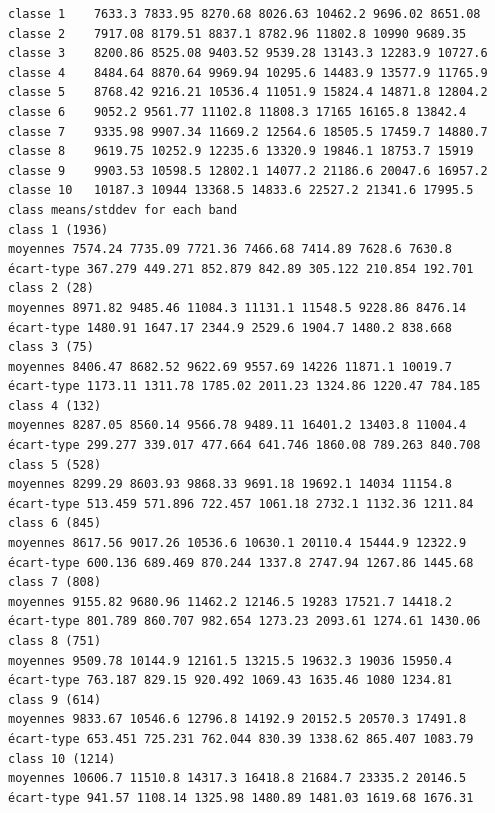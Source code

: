 \documentclass[environments,article,submit,pdftex,moreauthors]{Definitions/mdpi}
\begin{document}
\begin{scriptsize}
\begin{verbatim}
classe 1    7633.3 7833.95 8270.68 8026.63 10462.2 9696.02 8651.08
classe 2    7917.08 8179.51 8837.1 8782.96 11802.8 10990 9689.35
classe 3    8200.86 8525.08 9403.52 9539.28 13143.3 12283.9 10727.6
classe 4    8484.64 8870.64 9969.94 10295.6 14483.9 13577.9 11765.9
classe 5    8768.42 9216.21 10536.4 11051.9 15824.4 14871.8 12804.2
classe 6    9052.2 9561.77 11102.8 11808.3 17165 16165.8 13842.4
classe 7    9335.98 9907.34 11669.2 12564.6 18505.5 17459.7 14880.7
classe 8    9619.75 10252.9 12235.6 13320.9 19846.1 18753.7 15919
classe 9    9903.53 10598.5 12802.1 14077.2 21186.6 20047.6 16957.2
classe 10   10187.3 10944 13368.5 14833.6 22527.2 21341.6 17995.5
class means/stddev for each band
class 1 (1936)
moyennes 7574.24 7735.09 7721.36 7466.68 7414.89 7628.6 7630.8
écart-type 367.279 449.271 852.879 842.89 305.122 210.854 192.701
class 2 (28)
moyennes 8971.82 9485.46 11084.3 11131.1 11548.5 9228.86 8476.14
écart-type 1480.91 1647.17 2344.9 2529.6 1904.7 1480.2 838.668
class 3 (75)
moyennes 8406.47 8682.52 9622.69 9557.69 14226 11871.1 10019.7
écart-type 1173.11 1311.78 1785.02 2011.23 1324.86 1220.47 784.185
class 4 (132)
moyennes 8287.05 8560.14 9566.78 9489.11 16401.2 13403.8 11004.4
écart-type 299.277 339.017 477.664 641.746 1860.08 789.263 840.708
class 5 (528)
moyennes 8299.29 8603.93 9868.33 9691.18 19692.1 14034 11154.8
écart-type 513.459 571.896 722.457 1061.18 2732.1 1132.36 1211.84
class 6 (845)
moyennes 8617.56 9017.26 10536.6 10630.1 20110.4 15444.9 12322.9
écart-type 600.136 689.469 870.244 1337.8 2747.94 1267.86 1445.68
class 7 (808)
moyennes 9155.82 9680.96 11462.2 12146.5 19283 17521.7 14418.2
écart-type 801.789 860.707 982.654 1273.23 2093.61 1274.61 1430.06
class 8 (751)
moyennes 9509.78 10144.9 12161.5 13215.5 19632.3 19036 15950.4
écart-type 763.187 829.15 920.492 1069.43 1635.46 1080 1234.81
class 9 (614)
moyennes 9833.67 10546.6 12796.8 14192.9 20152.5 20570.3 17491.8
écart-type 653.451 725.231 762.044 830.39 1338.62 865.407 1083.79
class 10 (1214)
moyennes 10606.7 11510.8 14317.3 16418.8 21684.7 23335.2 20146.5
écart-type 941.57 1108.14 1325.98 1480.89 1481.03 1619.68 1676.31


\end{verbatim}
\end{scriptsize}
\end{document}
